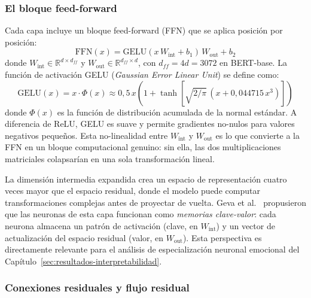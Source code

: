 \subsubsection{El bloque feed-forward}
\label{sec:sota-ffn}

Cada capa incluye un bloque feed-forward (FFN) que se aplica posición por posición:
\begin{equation}
    \text{FFN}(x) = \text{GELU}(x\, W_{\text{int}} + b_1)\, W_{\text{out}} + b_2
    \label{eq:ffn}
\end{equation}
donde $W_{\text{int}} \in \mathbb{R}^{d \times d_{ff}}$ y $W_{\text{out}} \in
\mathbb{R}^{d_{ff} \times d}$, con $d_{ff} = 4d = 3072$ en BERT-base. La función
de activación GELU (\textit{Gaussian Error Linear Unit}) \cite{hendrycks2016gaussian}
se define como:
\begin{equation}
    \text{GELU}(x) = x \cdot \Phi(x) \approx 0{,}5\, x \left(1 + \tanh\!\left[\sqrt{2/\pi}\,(x + 0{,}044715\, x^3)\right]\right)
    \label{eq:gelu}
\end{equation}
donde $\Phi(x)$ es la función de distribución acumulada de la normal estándar. A
diferencia de ReLU, GELU es suave y permite gradientes no-nulos para valores negativos
pequeños. Esta no-linealidad entre $W_{\text{int}}$ y $W_{\text{out}}$ es lo que
convierte a la FFN en un bloque computacional genuino: sin ella, las dos
multiplicaciones matriciales colapsarían en una sola transformación lineal.

La dimensión
intermedia expandida crea un espacio de representación cuatro veces mayor que el
espacio residual, donde el modelo puede computar transformaciones complejas antes de
proyectar de vuelta. Geva et al.\ \cite{geva2021transformer} propusieron que las
neuronas de esta capa funcionan como \emph{memorias clave-valor}: cada neurona
almacena un patrón de activación (clave, en $W_{\text{int}}$) y un vector de
actualización del espacio residual (valor, en $W_{\text{out}}$). Esta perspectiva
es directamente relevante para el análisis de especialización neuronal emocional
del Capítulo~\ref{sec:resultados-interpretabilidad}.

\subsubsection{Conexiones residuales y flujo residual}
\label{sec:sota-residual}

